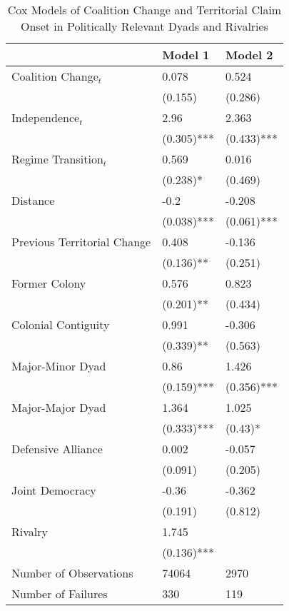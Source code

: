  
\begin{table}[htpb]
	\caption{Cox Models of Coalition Change and Territorial Claim Onset in Politically Relevant Dyads and Rivalries \label{tab_srd}}
	\centering
	\begin{tabular}{lll}
		\hline
									& Model 1    & Model 2	  \\ \hline
		Coalition Change$_{t}$      & 0.078      & 0.524      \\
		                            & (0.155)    & (0.286)    \\
		Independence$_t$            & 2.96       & 2.363      \\
		                            & (0.305)*** & (0.433)*** \\
		Regime Transition$_t$       & 0.569      & 0.016      \\
		                            & (0.238)*   & (0.469)    \\
		Distance                    & -0.2       & -0.208     \\
		                            & (0.038)*** & (0.061)*** \\
		Previous Territorial Change & 0.408      & -0.136     \\
		                            & (0.136)**  & (0.251)    \\
		Former Colony               & 0.576      & 0.823      \\
		                            & (0.201)**  & (0.434)   \\
		Colonial Contiguity         & 0.991      & -0.306     \\
		                            & (0.339)**  & (0.563)    \\
		Major-Minor Dyad            & 0.86       & 1.426      \\
		                            & (0.159)*** & (0.356)*** \\
		Major-Major Dyad            & 1.364      & 1.025      \\
		                            & (0.333)*** & (0.43)*    \\
		Defensive Alliance          & 0.002      & -0.057     \\
		                            & (0.091)    & (0.205)    \\
		Joint Democracy             & -0.36      & -0.362     \\
		                            & (0.191)    & (0.812)    \\
		Rivalry                     & 1.745      &            \\
		                            & (0.136)*** &            \\
		Number of Observations      & 74064      & 2970       \\
		Number of Failures          & 330        & 119        \\ \hline
	\end{tabular}
\end{table}

